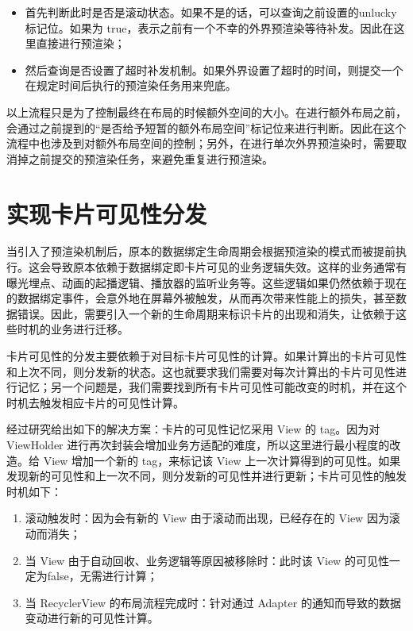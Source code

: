 

\begin{itemize}
    \item 首先判断此时是否是滚动状态。如果不是的话，可以查询之前设置的unlucky 标记位。如果为 true，表示之前有一个不幸的外界预渲染等待补发。因此在这里直接进行预渲染；
    \item 然后查询是否设置了超时补发机制。如果外界设置了超时的时间，则提交一个在规定时间后执行的预渲染任务用来兜底。
\end{itemize}

以上流程只是为了控制最终在布局的时候额外空间的大小。在进行额外布局之前，会通过之前提到的“是否给予短暂的额外布局空间”标记位来进行判断。因此在这个流程中也涉及到对额外布局空间的控制；另外，在进行单次外界预渲染时，需要取消掉之前提交的预渲染任务，来避免重复进行预渲染。


\section{实现卡片可见性分发}

当引入了预渲染机制后，原本的数据绑定生命周期会根据预渲染的模式而被提前执行。这会导致原本依赖于数据绑定即卡片可见的业务逻辑失效。这样的业务通常有曝光埋点、动画的起播逻辑、播放器的监听业务等。这些逻辑如果仍然依赖于现在的数据绑定事件，会意外地在屏幕外被触发，从而再次带来性能上的损失，甚至数据错误。因此，需要引入一个新的生命周期来标识卡片的出现和消失，让依赖于这些时机的业务进行迁移。

卡片可见性的分发主要依赖于对目标卡片可见性的计算。如果计算出的卡片可见性和上次不同，则分发新的状态。这也就要求我们需要对每次计算出的卡片可见性进行记忆；另一个问题是，我们需要找到所有卡片可见性可能改变的时机，并在这个时机去触发相应卡片的可见性计算。

经过研究给出如下的解决方案：卡片的可见性记忆采用 View 的 tag。因为对 ViewHolder 进行再次封装会增加业务方适配的难度，所以这里进行最小程度的改造。给 View 增加一个新的 tag，来标记该 View 上一次计算得到的可见性。如果发现新的可见性和上一次不同，则分发新的可见性并进行更新；卡片可见性的触发时机如下：

\begin{enumerate}
    \item 滚动触发时：因为会有新的 View 由于滚动而出现，已经存在的 View 因为滚动而消失；
    \item 当 View 由于自动回收、业务逻辑等原因被移除时：此时该 View 的可见性一定为false，无需进行计算；
    \item 当 RecyclerView 的布局流程完成时：针对通过 Adapter 的通知而导致的数据变动进行新的可见性计算。
\end{enumerate}

